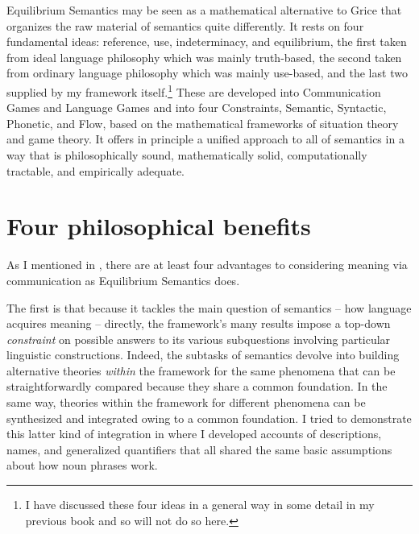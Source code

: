 
Equilibrium Semantics may be seen as a mathematical alternative to Grice that organizes the raw material of semantics quite differently. It rests on four fundamental ideas: reference, use, indeterminacy, and equilibrium, the first taken from ideal language philosophy which was mainly truth-based, the second taken from ordinary language philosophy which was mainly use-based, and the last two supplied by my framework itself.\footnote{I have discussed these four ideas in a general way in some detail in my previous book and so will not do so here.} These are developed into Communication Games and Language Games and into four Constraints, Semantic, Syntactic, Phonetic, and Flow, based on the mathematical frameworks of situation theory and game theory. It offers in principle a unified approach to all of semantics in a way that is philosophically sound, mathematically solid, computationally tractable, and empirically adequate.


\section{Four philosophical benefits}

As I mentioned in , there are at least four advantages to considering meaning via communication as Equilibrium Semantics does. 


The first is that because it tackles the main question of semantics -- how language acquires meaning -- directly, the framework's many results impose a top-down \emph{constraint} on possible answers to its various subquestions involving particular linguistic constructions. Indeed, the subtasks of semantics devolve into building alternative theories \emph{within} the framework for the same phenomena that can be straightforwardly compared because they share a common foundation. In the same way, theories within the framework for different phenomena can be synthesized and integrated owing to a common foundation. I tried to demonstrate this latter kind of integration in \citet[Chapter~6]{parikh:le} where I developed accounts of descriptions, names, and generalized quantifiers that all shared the same basic assumptions about how noun phrases work.

